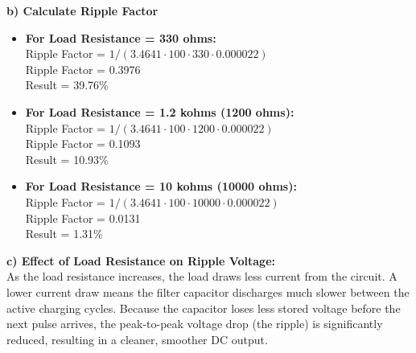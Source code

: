 \textbf{b) Calculate Ripple Factor}
\begin{itemize}
    \item \textbf{For Load Resistance = 330 ohms:} \\
    Ripple Factor = $1 / (3.4641 \cdot 100 \cdot 330 \cdot 0.000022)$ \\
    Ripple Factor = 0.3976 \\
    Result = 39.76\%
    
    \item \textbf{For Load Resistance = 1.2 kohms (1200 ohms):} \\
    Ripple Factor = $1 / (3.4641 \cdot 100 \cdot 1200 \cdot 0.000022)$ \\
    Ripple Factor = 0.1093 \\
    Result = 10.93\%
    
    \item \textbf{For Load Resistance = 10 kohms (10000 ohms):} \\
    Ripple Factor = $1 / (3.4641 \cdot 100 \cdot 10000 \cdot 0.000022)$ \\
    Ripple Factor = 0.0131 \\
    Result = 1.31\%
\end{itemize}

\textbf{c) Effect of Load Resistance on Ripple Voltage:} \\
As the load resistance increases, the load draws less current from the circuit. A lower current draw means the filter capacitor discharges much slower between the active charging cycles. Because the capacitor loses less stored voltage before the next pulse arrives, the peak-to-peak voltage drop (the ripple) is significantly reduced, resulting in a cleaner, smoother DC output.

